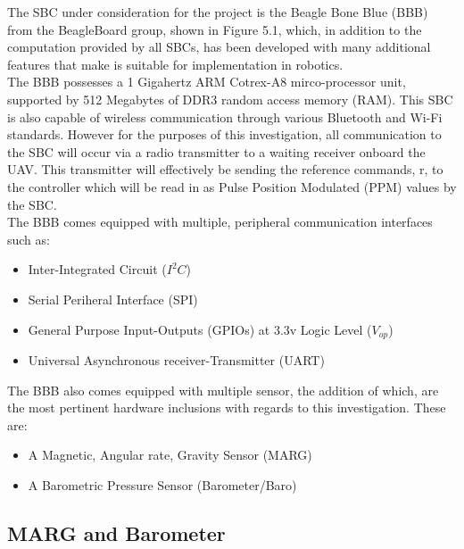 \documentclass[12pt,a4paper,twoside]{report}
\begin{document}
			The SBC under consideration for the project is the Beagle Bone Blue (BBB) from the BeagleBoard group, shown in Figure 5.1, which, in addition to the computation provided by all SBCs, has been developed with many additional features that make is suitable for implementation in robotics.
			\\
			The BBB possesses a 1 Gigahertz ARM Cotrex-A8 mirco-processor unit, supported by 512 Megabytes of DDR3 random access memory (RAM). This SBC is also capable of wireless communication through various Bluetooth and Wi-Fi standards. However for the purposes of this investigation, all communication to the SBC will occur via a radio transmitter to a waiting receiver onboard the UAV. This transmitter will effectively be sending the reference commands, r, to the controller which will be read in as Pulse Position Modulated (PPM) values by the SBC. 
			\\
			The BBB comes equipped with multiple, peripheral communication interfaces such as:
			\\
			\begin{itemize}
				\item
					Inter-Integrated Circuit ($I^{2}C$)
				\item
					Serial Periheral Interface (SPI)
				\item
					 General Purpose Input-Outputs (GPIOs) at 3.3v Logic Level ($V_{op}$)
				\item
					Universal Asynchronous receiver-Transmitter (UART) 
			\end{itemize}  
			
			The BBB also comes equipped with multiple sensor, the addition of which, are the most pertinent hardware inclusions with regards to this investigation. These are:
			\\
			\begin{itemize}
				\item
					A Magnetic, Angular rate, Gravity Sensor (MARG)
				\item
					A Barometric Pressure Sensor (Barometer/Baro)
			\end{itemize}  
			
			\subsection{MARG and Barometer}
			
\end{document}

